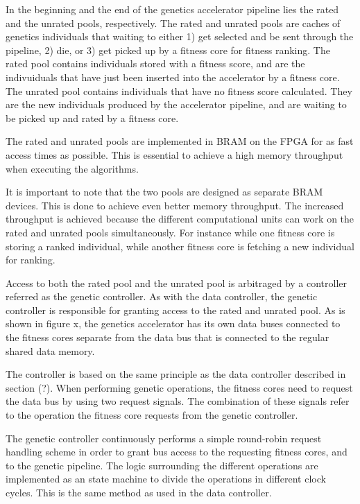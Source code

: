 In the beginning and the end of the genetics accelerator pipeline lies the rated and the unrated pools, respectively.
The rated and unrated pools are caches of genetics individuals that waiting to either 1) get selected and be sent through the pipeline, 2) die, or 3) get picked up by a fitness core for fitness ranking.
The rated pool contains individuals stored with a fitness score, and are the indivuiduals that have just been inserted into the accelerator by a fitness core.
The unrated pool contains individuals that have no fitness score calculated.
They are the new individuals produced by the accelerator pipeline, and are waiting to be picked up and rated by a fitness core.

The rated and unrated pools are implemented in \gls{BRAM} on the FPGA for as fast access times as possible.
This is essential to achieve a high memory throughput when executing the algorithms.

It is important to note that the two pools are designed as separate \gls{BRAM} devices.
This is done to achieve even better memory throughput.
The increased throughput is achieved because the different computational units can work on the rated and unrated pools simultaneously.
For instance while one fitness core is storing a ranked individual, while another fitness core is fetching a new individual for ranking. 

Access to both the rated pool and the unrated pool is arbitraged by a controller referred as the \gls{genetic controller}.
As with the \gls{data controller}, the \gls{genetic controller} is responsible for granting access to the rated and unrated pool.
As is shown in figure x\cn{}, the genetics accelerator has its own data buses connected to the fitness cores separate from the data bus that is connected to the regular shared data memory.

The controller is based on the same principle as the \gls{data controller} described in section (?)\cn.
When performing genetic operations, the fitness cores need to request the data bus by using two request signals.
The combination of these signals refer to the operation the fitness core requests from the genetic controller. 

The genetic controller continuously performs a simple round-robin request handling scheme in order to grant bus access to the requesting fitness cores, and to the genetic pipeline.
The logic surrounding the different operations are implemented as an state machine to divide the operations in different clock cycles.
This is the same method as used in the data controller.

